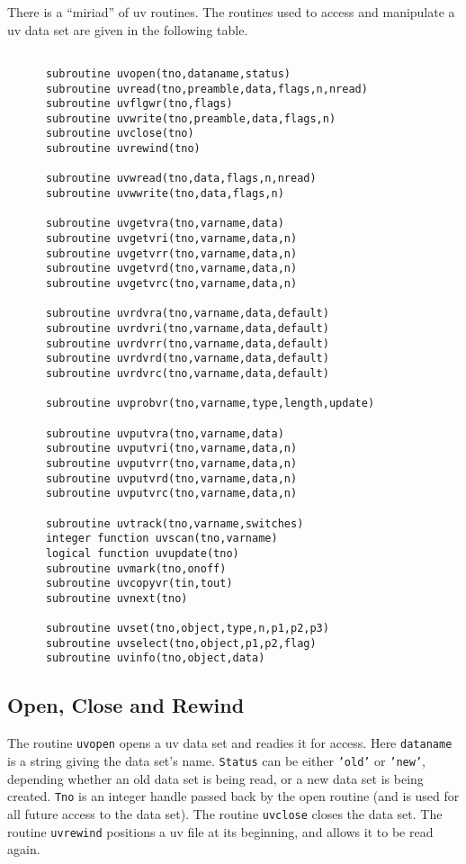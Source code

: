 \documentclass{report}
\begin{document}
There is a ``miriad'' of uv routines.
The routines used to access and manipulate a uv data set are given in the
following table.
\begin{table}
\begin{verbatim}

      subroutine uvopen(tno,dataname,status)
      subroutine uvread(tno,preamble,data,flags,n,nread)
      subroutine uvflgwr(tno,flags)
      subroutine uvwrite(tno,preamble,data,flags,n)
      subroutine uvclose(tno)
      subroutine uvrewind(tno)

      subroutine uvwread(tno,data,flags,n,nread)
      subroutine uvwwrite(tno,data,flags,n)

      subroutine uvgetvra(tno,varname,data)
      subroutine uvgetvri(tno,varname,data,n)
      subroutine uvgetvrr(tno,varname,data,n)
      subroutine uvgetvrd(tno,varname,data,n)
      subroutine uvgetvrc(tno,varname,data,n)

      subroutine uvrdvra(tno,varname,data,default)
      subroutine uvrdvri(tno,varname,data,default)
      subroutine uvrdvrr(tno,varname,data,default)
      subroutine uvrdvrd(tno,varname,data,default)
      subroutine uvrdvrc(tno,varname,data,default)

      subroutine uvprobvr(tno,varname,type,length,update)

      subroutine uvputvra(tno,varname,data)
      subroutine uvputvri(tno,varname,data,n)
      subroutine uvputvrr(tno,varname,data,n)
      subroutine uvputvrd(tno,varname,data,n)
      subroutine uvputvrc(tno,varname,data,n)

      subroutine uvtrack(tno,varname,switches)
      integer function uvscan(tno,varname)
      logical function uvupdate(tno)
      subroutine uvmark(tno,onoff)
      subroutine uvcopyvr(tin,tout)
      subroutine uvnext(tno)

      subroutine uvset(tno,object,type,n,p1,p2,p3)
      subroutine uvselect(tno,object,p1,p2,flag)
      subroutine uvinfo(tno,object,data)
\end{verbatim}
\caption{UV Data Subroutines}
\end{table}

\subsection{Open, Close and Rewind}
The routine {\tt uvopen} opens a uv data set and readies it for access.
Here {\tt dataname} is a string giving the data set's name. {\tt Status} can
be either {\tt 'old'} or {\tt 'new'}, depending whether an old data set is
being read, or a new data set is being created. {\tt Tno} is an integer
handle passed back by the open routine (and is used for all future access
to the data set). The routine {\tt uvclose} closes the data set.
The routine {\tt uvrewind} positions a uv file at its beginning, and
allows it to be read again.
\end{document}
